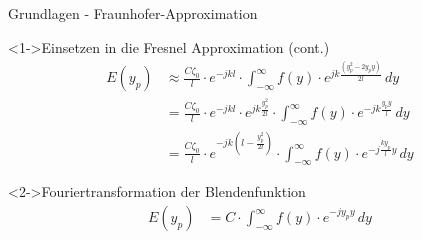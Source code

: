 \begin{frame}{Grundlagen - Fraunhofer-Approximation}
    \begin{block}<1->{Einsetzen in die Fresnel Approximation (cont.)}
        \begin{align*}
            E(y_p)
            &\approx
            \frac{C\zeta_0}{l} \cdot e^{-jkl} \cdot \int_{-\infty}^{\infty}f(y)\cdot e^{jk\frac{(y_p^2 - 2y_py)}{2l}} \,dy
            \\
            &=
            \frac{C\zeta_0}{l} \cdot e^{-jkl} \cdot e^{jk\frac{y_p^2}{2l}} \cdot \int_{-\infty}^{\infty}f(y)\cdot e^{-jk\frac{y_py}{l}} \,dy
            \\
            &=
            \frac{C\zeta_0}{l} \cdot e^{-jk\left(l-\frac{y_p^2}{2l}\right)} \cdot \int_{-\infty}^{\infty}f(y)\cdot e^{-j\frac{ky_p}{l}y} \,dy
        \end{align*}
    \end{block}
    \begin{exampleblock}<2->{Fouriertransformation der Blendenfunktion}
        \begin{align*}
            E(y_p)
            &=
            C \cdot \int_{-\infty}^{\infty}f(y)\cdot e^{-jy_py} \,dy
        \end{align*}
    \end{exampleblock}
\end{frame}
